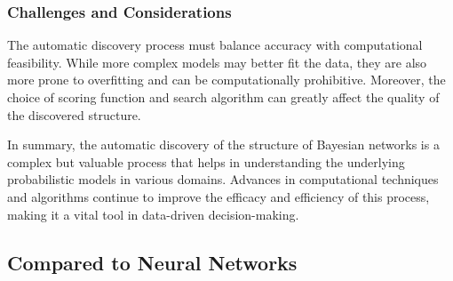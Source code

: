 \subsubsection{Challenges and Considerations}
The automatic discovery process must balance accuracy with computational feasibility. While more complex models may better fit the data, they are also more prone to overfitting and can be computationally prohibitive. Moreover, the choice of scoring function and search algorithm can greatly affect the quality of the discovered structure.

In summary, the automatic discovery of the structure of Bayesian networks is a complex but valuable process that helps in understanding the underlying probabilistic models in various domains. Advances in computational techniques and algorithms continue to improve the efficacy and efficiency of this process, making it a vital tool in data-driven decision-making.

\subsection{Compared to Neural Networks}